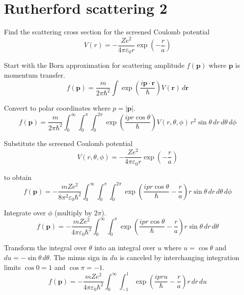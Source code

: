 

\section*{Rutherford scattering 2}

Find the scattering cross section for the screened Coulomb potential
\begin{equation*}
V(r)=-\frac{Ze^2}{4\pi\varepsilon_0r}\exp\left(-\frac{r}{a}\right)
\end{equation*}

Start with the Born approximation for scattering amplitude $f(\mathbf p)$ where $\mathbf p$
is momentum transfer.
\begin{equation*}
f(\mathbf p)
=\frac{m}{2\pi\hbar^2}
\int\exp\left(\frac{i\mathbf p\cdot\mathbf r}{\hbar}\right)V(\mathbf r)\,d\mathbf r
\end{equation*}

Convert to polar coordinates where $p=|\mathbf p|$.
\begin{equation*}
f(\mathbf p)
=\frac{m}{2\pi\hbar^2}
\int_0^\infty
\int_0^\pi
\int_0^{2\pi}
\exp\left(\frac{ipr\cos\theta}{\hbar}\right)V(r,\theta,\phi)
\,r^2\sin\theta\,dr\,d\theta\,d\phi
\end{equation*}

Substitute the screened Coulomb potential
\begin{equation*}
V(r,\theta,\phi)=-\frac{Ze^2}{4\pi\varepsilon_0r}\exp\left(-\frac{r}{a}\right)
\end{equation*}

to obtain
\begin{equation*}
f(\mathbf p)
=-\frac{mZe^2}{8\pi^2\varepsilon_0\hbar^2}
\int_0^\infty
\int_0^\pi
\int_0^{2\pi}
\exp\left(\frac{ipr\cos\theta}{\hbar}-\frac{r}{a}\right)
r\sin\theta\,dr\,d\theta\,d\phi
\end{equation*}

Integrate over $\phi$ (multiply by $2\pi$).
\begin{equation*}
f(\mathbf p)
=-\frac{mZe^2}{4\pi\varepsilon_0\hbar^2}
\int_0^\infty
\int_0^\pi
\exp\left(\frac{ipr\cos\theta}{\hbar}-\frac{r}{a}\right)
r\sin\theta\,dr\,d\theta
\end{equation*}

Transform the integral over $\theta$ into an integral over $u$
where $u=\cos\theta$ and $du=-\sin\theta\,d\theta$.
The minus sign in $du$ is canceled by interchanging integration limits
$\cos0=1$ and $\cos\pi=-1$.
\begin{equation*}
f(\mathbf p)
=-\frac{mZe^2}{4\pi\varepsilon_0\hbar^2}
\int_0^\infty
\int_{-1}^1
\exp\left(\frac{ipru}{\hbar}-\frac{r}{a}\right)
r\,dr\,du
\end{equation*}


